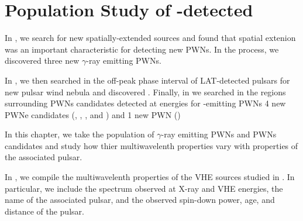 \chapter{Population Study of -detected }


In , we search for new spatially-extended \fermi
sources and found that spatial extenion was an important characteristic
for detecting new \acp{PWN}. In the process, we discovered three
new $\gamma$-ray emitting \acp{PWN}.  

In , we then
searched in the off-peak phase interval of \ac{LAT}-detected pulsars
for new pulsar wind nebula and discovered \threecfiftyeight.  Finally,
in  we searched in the regions surrounding \acp{PWN}
candidates detected at \tev energies for \gev-emitting \acp{PWN}
4 new PWNe candidates (, , ,
and ) and 1 new PWN ()

In this chapter, we take the population of $\gamma$-ray emitting \acp{PWN}
and \acp{PWN} candidates and study how thier multiwavelenth properties
vary with properties of the associated pulsar.




In , we compile the multiwavelenth
properties of the \ac{VHE} sources studied in . In
particular, we include the spectrum observed at X-ray and \ac{VHE}
energies, the name of the associated pulsar, and the observed spin-down
power, age, and distance of the pulsar.



